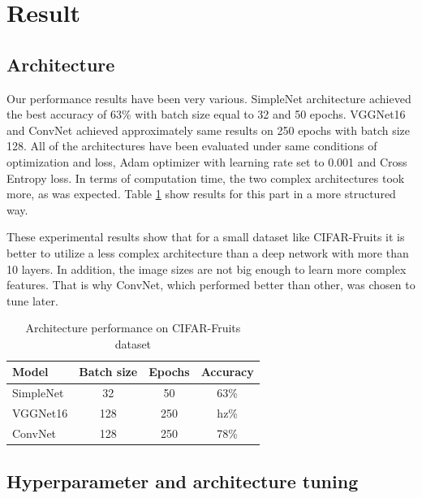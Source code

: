 \documentclass{IEEEtran}
\begin{document}
\section{Result}

\subsection{Architecture}

Our performance results have been very various. SimpleNet architecture achieved the best accuracy of 63\% with batch size equal to 32 and 50 epochs. VGGNet16 and ConvNet achieved approximately same results on 250 epochs with batch size 128. All of the architectures have been evaluated under same conditions of optimization and loss, Adam optimizer \cite{DBLP:journals/corr/KingmaB14} with learning rate set to 0.001 and Cross Entropy loss. In terms of computation time, the two complex architectures took more, as was expected. Table \ref{tab:arch} show results for this part in a more structured way.

These experimental results show that for a small dataset like CIFAR-Fruits it is better to utilize a less complex architecture than a deep network with more than 10 layers. In addition, the image sizes are not big enough to learn more complex features. That is why ConvNet, which performed better than other, was chosen to tune later.

\begin{table}[!t]
\caption{Architecture performance on CIFAR-Fruits dataset}
\label{tab:arch}
\centering
\begin{tabular}{ l|c c c }
\toprule
\textbf{Model} & \textbf{Batch size} & \textbf{Epochs} & \textbf{Accuracy} \\
\hline
SimpleNet \cite{DBLP:journals/corr/HasanPourRVS16} & 32 & 50 & 63\% \\
\hline
VGGNet16 \cite{DBLP:journals/corr/SimonyanZ14a} & 128 & 250 & hz\% \\
\hline
ConvNet & 128 & 250 & 78\% \\
\bottomrule
\end{tabular}
\end{table}

\subsection{Hyperparameter and architecture tuning}
\end{document}
